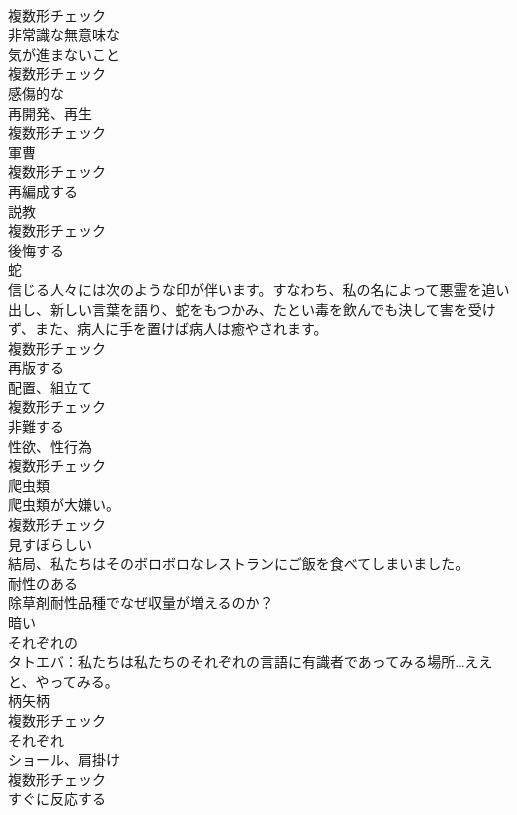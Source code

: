 \documentclass[8pt]{extreport}
\begin{document}
\begin{CJK}{UTF8}{min}
\\	複数形チェック
\\	[形容詞]	非常識な無意味な	
\\	[名詞]	気が進まないこと	
\\	複数形チェック
\\	[形容詞]	感傷的な	
\\	[名詞]	再開発、再生	
\\	複数形チェック
\\	[名詞]	軍曹	
\\	複数形チェック
\\	[動詞]	再編成する	
\\	[名詞]	説教	
\\	複数形チェック
\\	[動詞]	後悔する	
\\	[名詞]	蛇	
\\	信じる人々には次のような印が伴います。すなわち、私の名によって悪霊を追い出し、新しい言葉を語り、蛇をもつかみ、たとい毒を飲んでも決して害を受けず、また、病人に手を置けば病人は癒やされます。	
\\	複数形チェック
\\	[動詞]	再版する	
\\	[名詞]	配置、組立て	
\\	複数形チェック
\\	[動詞]	非難する	
\\	[名詞]	性欲、性行為	
\\	複数形チェック
\\	[名詞]	爬虫類	
\\	爬虫類が大嫌い。	
\\	複数形チェック
\\	[形容詞]	見すぼらしい	
\\	結局、私たちはそのボロボロなレストランにご飯を食べてしまいました。	
\\	[形容詞]	耐性のある	
\\	除草剤耐性品種でなぜ収量が増えるのか？	
\\	[形容詞]	暗い	
\\	[形容詞]	それぞれの	
\\	タトエバ：私たちは私たちのそれぞれの言語に有識者であってみる場所…ええと、やってみる。	
\\	[名詞]	柄矢柄	
\\	複数形チェック
\\	[形容詞]	それぞれ	
\\	[名詞]	ショール、肩掛け	
\\	複数形チェック
\\	[形容詞]	すぐに反応する	

\end{CJK}
\end{document}
